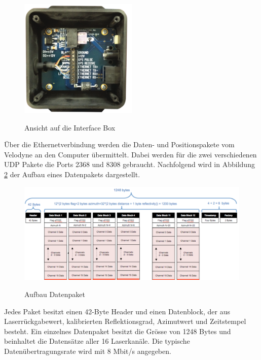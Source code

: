\begin{figure}[H]
	\centering
	\includegraphics[width=0.5\textwidth]
	{resources/InterfaceBox.PNG}
	\caption[Ansicht auf die Interfacebox]{Ansicht auf die Interface Box} \protect\cite{velodyne}
	\label{fig:InterfaceBox}
\end{figure}

Über die Ethernetverbindung werden die Daten- und Positionspakete vom Velodyne an den Computer übermittelt. Dabei werden für die zwei verschiedenen \ac{UDP} Pakete die Ports 2368 und 8308 gebraucht. Nachfolgend wird in Abbildung \ref{fig:datapakets} der Aufbau eines Datenpakets dargestellt.

\begin{figure}[H]
	\centering
	\includegraphics[width=1.0\textwidth]
	{resources/datapakets.PNG}
	\caption[Aufbau Datenpaket]{Aufbau Datenpaket} \protect\cite{velodyne}
	\label{fig:datapakets}
\end{figure}

 Jedes Paket besitzt einen 42-Byte Header und einen Datenblock, der aus Laserrückgabewert, kalibrierten Reflektionsgrad, Azimutwert und Zeitstempel besteht. Ein einzelnes Datenpaket besitzt die Grösse von 1248 Bytes und beinhaltet die Datensätze aller 16 Laserkanäle. Die typische Datenübertragungsrate wird mit 8 Mbit/s angegeben.

